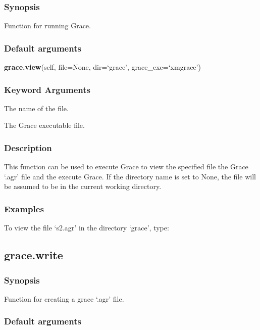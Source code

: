 \subsubsection{Synopsis}

Function for running Grace.

\subsubsection{Default arguments}

\textsf{\textbf{grace.view}(self, file=None, dir=`grace', grace\_exe=`xmgrace')}


\subsubsection{Keyword Arguments}

  The name of the file.

  The Grace executable file.

\subsubsection{Description}

This function can be used to execute Grace to view the specified file the Grace `.agr' file
and the execute Grace. If the directory name is set to None, the file will be assumed to be
in the current working directory.


\subsubsection{Examples}

To view the file `s2.agr' in the directory `grace', type:




\newpage

\subsection{grace.write}


\subsubsection{Synopsis}

Function for creating a grace `.agr' file.

\subsubsection{Default arguments}

